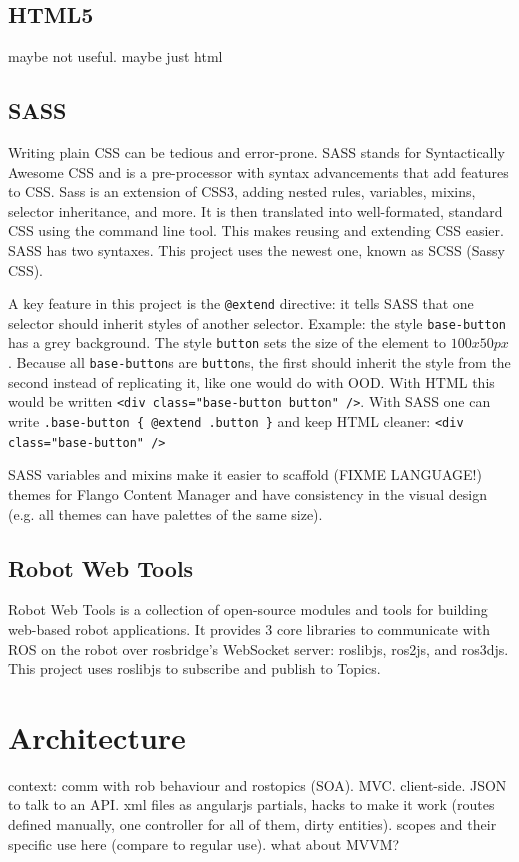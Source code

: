     
\subsection{HTML5}
maybe not useful. maybe just html

\subsection{SASS}
Writing plain \ac{CSS} can be tedious and error-prone.
SASS stands for Syntactically Awesome CSS and is a pre-processor with syntax advancements that add features to \ac{CSS}.
Sass is an extension of \ac{CSS}3, adding nested rules, variables, mixins, selector inheritance, and more.
It is then translated into well-formated, standard \ac{CSS} using the command line tool.
This makes reusing and extending \ac{CSS} easier.
SASS has two syntaxes. This project uses the newest one, known as \ac{SCSS} (Sassy CSS).

A key feature in this project is the \lstinline$@extend$ directive: it tells \ac{SASS} that one selector should inherit styles of another selector.
Example: the style \texttt{base-button} has a grey background. The style \texttt{button} sets the size of the element to $100 x 50 px$.
Because all \texttt{base-button}s are \texttt{button}s, the first should inherit the style from the second instead of replicating it, like one would do with \ac{OOD}.
With \ac{HTML} this would be written \lstinline$<div class="base-button button" />$.
With SASS one can write \lstinline$.base-button { @extend .button }$ and keep \ac{HTML} cleaner: \lstinline$<div class="base-button" />$

SASS variables and mixins make it easier to scaffold (FIXME LANGUAGE!) themes for Flango Content Manager and have consistency in the visual design (e.g. all themes can have palettes of the same size).

\subsection{Robot Web Tools}
Robot Web Tools is a collection of open-source modules and tools for building web-based robot applications.
It provides 3 core libraries to communicate with \ac{ROS} on the robot over rosbridge's WebSocket server: roslibjs, ros2js, and ros3djs.
This project uses roslibjs to subscribe and publish to Topics.

\section{Architecture}
context: comm with rob behaviour and rostopics (SOA).
MVC. client-side. JSON to talk to an API. xml files as angularjs partials, hacks to make it work (routes defined manually, one controller for all of them, dirty entities). scopes and their specific use here (compare to regular use). what about MVVM?

